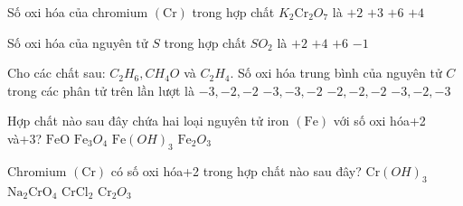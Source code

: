\begin{ex}[Đề THPT QG-2018]
	Số oxi hóa của chromium $(\mathrm{Cr})$ trong hợp chất $K_2\mathrm{Cr}_2O_7$ là
	\choice
	{$+2$}
	{$+3$}
	{\True $+6$}
	{$+4$}
\end{ex}
\begin{ex}
	Số oxi hóa của nguyên tử $S$ trong hợp chất $SO_2$ là
	\choice
	{$+2$}
	{\True $+4$}
	{$+6$}
	{$-1$}
\end{ex}
\begin{ex}
	Cho các chất sau: $C_2H_6, CH_4O$ và $C_2H_4$. Số oxi hóa trung bình của nguyên tử $C$ trong các phân tử trên lần lượt là
	\choice
	{\True $-3,-2, -2$}
	{$-3,-3,-2$}
	{$-2,-2,-2$}
	{$-3,-2,-3$}
\end{ex}
\begin{ex}
	Hợp chất nào sau đây chứa hai loại nguyên tử iron $(\mathrm{Fe})$ với số oxi hóa+2 và+3?
	\choice
	{$\mathrm{FeO}$}
	{\True $\mathrm{Fe}_3O_4$}
	{$\mathrm{Fe}(OH)_3$}
	{$\mathrm{Fe}_2O_3$}
\end{ex}
\begin{ex}
	Chromium $(\mathrm{Cr})$ có số oxi hóa+2 trong hợp chất nào sau đây?
	\choice
	{$\mathrm{Cr}(OH)_3$}
	{$\mathrm{Na}_2\mathrm{CrO}_4$}
	{\True $\mathrm{CrCl}_2$}
	{$\mathrm{Cr}_2O_3$}
\end{ex}

